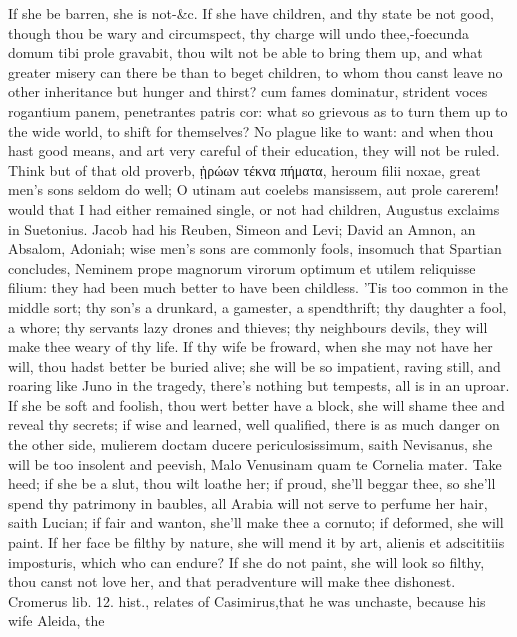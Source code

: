 {If she be barren, she is not-\&c. If she have children, and thy
state be not good, though thou be wary and circumspect, thy charge will
undo thee,-foecunda domum tibi prole gravabit, thou wilt not be
able to bring them up, and what greater misery can there be than
to beget children, to whom thou canst leave no other inheritance but
hunger and thirst? cum fames dominatur, strident voces rogantium
panem, penetrantes patris cor: what so grievous as to turn them up to
the wide world, to shift for themselves? No plague like to want: and
when thou hast good means, and art very careful of their education,
they will not be ruled. Think but of that old proverb, ᾑρώων τέκνα
πήματα, heroum filii noxae, great men's sons seldom do well; O utinam
aut coelebs mansissem, aut prole carerem! would that I had either
remained single, or not had children, Augustus exclaims in
Suetonius. Jacob had his Reuben, Simeon and Levi; David an Amnon, an
Absalom, Adoniah; wise men's sons are commonly fools, insomuch that
Spartian concludes, Neminem prope magnorum virorum optimum et utilem
reliquisse filium: they had been much better to have been
childless. 'Tis too common in the middle sort; thy son's a drunkard, a
gamester, a spendthrift; thy daughter a fool, a whore; thy servants
lazy drones and thieves; thy neighbours devils, they will make thee
weary of thy life. If thy wife be froward, when she may not have
her will, thou hadst better be buried alive; she will be so impatient,
raving still, and roaring like Juno in the tragedy, there's nothing but
tempests, all is in an uproar. If she be soft and foolish, thou wert
better have a block, she will shame thee and reveal thy secrets; if
wise and learned, well qualified, there is as much danger on the other
side, mulierem doctam ducere periculosissimum, saith Nevisanus, she
will be too insolent and peevish, Malo Venusinam quam te Cornelia
mater. Take heed; if she be a slut, thou wilt loathe her; if proud,
she'll beggar thee, so she'll spend thy patrimony in baubles, all
Arabia will not serve to perfume her hair, saith Lucian; if fair and
wanton, she'll make thee a cornuto; if deformed, she will paint.
If her face be filthy by nature, she will mend it by art, alienis
et adscititiis imposturis, which who can endure? If she do not paint,
she will look so filthy, thou canst not love her, and that peradventure
will make thee dishonest. Cromerus lib. 12. hist., relates of
Casimirus,that he was unchaste, because his wife Aleida, the
}
